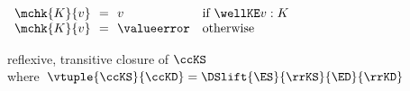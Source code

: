 \begin{flushleft}
\begin{minipage}[t]{\columnwidth}
\medskip
{}\\
$\begin{array}{l@{~~}c@{~~}l l}
  \mchk{K}{v} & = & v & \mbox{if $\wellKE v : K$}
\\
  \mchk{K}{v} & = & \valueerror & \mbox{otherwise}
\end{array}$

\medskip
{} reflexive, transitive closure of $\ccKS$\\
\mbox{\quad where $\vtuple{\ccKS}{\ccKD} = \DSlift{\ES}{\rrKS}{\ED}{\rrKD}$}
\end{minipage}
\smallskip

\end{flushleft}
